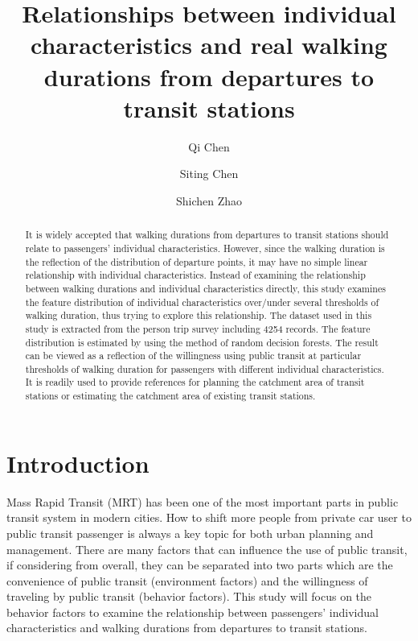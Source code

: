 \documentclass[Journal,letterpaper]{ascelike-new}
\begin{document}
\title{Relationships between individual characteristics and real walking durations from departures to transit stations}
%
\author[1]{Qi Chen}
\author[2]{Siting Chen}
\author[3]{Shichen Zhao}
%
%
\maketitle

\begin{abstract}
It is widely accepted that walking durations from departures to transit stations should relate to passengers' individual characteristics. However, since the walking duration is the reflection of the distribution of departure points, it may have no simple linear relationship with individual characteristics. Instead of examining the relationship between walking durations and individual characteristics directly, this study examines the feature distribution of individual characteristics over/under several thresholds of walking duration, thus trying to explore this relationship. The dataset used in this study is extracted from the person trip survey including 4254 records. The feature distribution is estimated by using the method of random decision forests. The result can be viewed as a reflection of the willingness using public transit at particular thresholds of walking duration for passengers with different individual characteristics. It is readily used to provide references for planning the catchment area of transit stations or estimating the catchment area of existing transit stations.
\end{abstract}

%
\section{Introduction}
Mass Rapid Transit (MRT) has been one of the most important parts in public transit system in modern cities. How to shift more people from private car user to public transit passenger is always a key topic for both urban planning and management. There are many factors that can influence the use of public transit, if considering from overall, they can be separated into two parts which are the convenience of public transit (environment factors) and the willingness of traveling by public transit (behavior factors). This study will focus on the behavior factors to examine the relationship between passengers' individual characteristics and walking durations from departures to transit stations.
\end{document}
